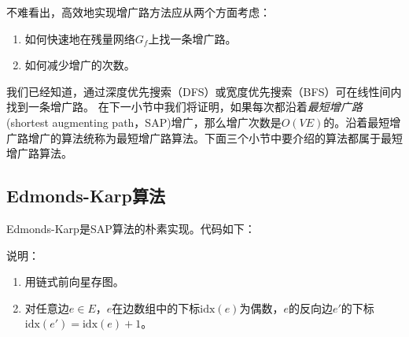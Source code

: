 \documentclass[a4paper]{ctexbook}
\newcommand{\idx}{\mathrm{idx}}
\begin{document}
  不难看出，高效地实现增广路方法应从两个方面考虑：
  \begin{enumerate}
    \item 如何快速地在残量网络$G_f$上找一条增广路。\label{Approach:1}
    \item 如何减少增广的次数。\label{Approach:2}
  \end{enumerate}
  我们已经知道，通过深度优先搜索（DFS）或宽度优先搜索（BFS）可在线性间内找到一条增广路。
  在下一小节中我们将证明，如果每次都沿着\emph{最短增广路}(shortest augmenting path，SAP)增广，那么增广次数是$O(VE)$的。沿着最短增广路增广的算法统称为最短增广路算法。下面三个小节中要介绍的算法都属于最短增广路算法。
  \subsection{Edmonds-Karp算法}
  Edmonds-Karp是SAP算法的朴素实现。代码如下：
  
  说明：
  \begin{enumerate}
    \item 用链式前向星存图。
    \item 对任意边$e \in E$，$e$在边数组中的下标$\idx(e)$为偶数，$e$的反向边$e'$的下标$\idx(e') = \idx(e) + 1$。
  \end{enumerate}
\end{document}
